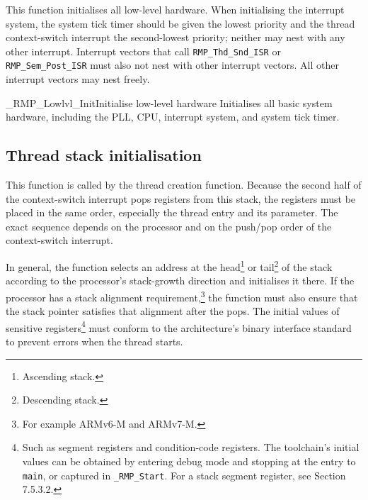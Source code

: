 This function initialises all low-level hardware.
When initialising the interrupt system, the system tick timer should be given the lowest priority and the thread context-switch interrupt the second-lowest priority; neither may nest with any other interrupt.
Interrupt vectors that call \texttt{RMP\_Thd\_Snd\_ISR} or \texttt{RMP\_Sem\_Post\_ISR} must also not nest with other interrupt vectors.
All other interrupt vectors may nest freely.

\begin{apidesc}{\_RMP\_Lowlvl\_Init}{Initialise low-level hardware}\label{port:Lowlvl_Init}
    Initialises all basic system hardware, including the PLL, CPU, interrupt system, and system tick timer.
    \begin{apiparams}
    \end{apiparams}
    \begin{apiret}
    \end{apiret}
\end{apidesc}

\subsection{Thread stack initialisation}

This function is called by the thread creation function.
Because the second half of the context-switch interrupt pops registers from this stack, the registers must be placed in the same order, especially the thread entry and its parameter.
The exact sequence depends on the processor and on the push/pop order of the context-switch interrupt.

In general, the function selects an address at the head\footnote{Ascending stack.} or tail\footnote{Descending stack.} of the stack according to the processor's stack-growth direction and initialises it there.
If the processor has a stack alignment requirement,\footnote{For example ARMv6-M and ARMv7-M.} the function must also ensure that the stack pointer satisfies that alignment after the pops.
The initial values of sensitive registers\footnote{Such as segment registers and condition-code registers. The toolchain's initial values can be obtained by entering debug mode and stopping at the entry to \texttt{main}, or captured in \texttt{\_RMP\_Start}. For a stack segment register, see Section 7.5.3.2.} must conform to the architecture's binary interface standard to prevent errors when the thread starts.

